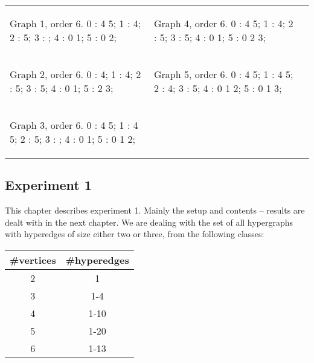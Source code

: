 \begin{tabular}{|p{1.5in} | p{1.5in} | p{1.5in} |}
\begin{minipage}{1.5in}
\begin{output}
Graph 1, order 6.
  0 : 4 5;
  1 : 4;
  2 : 5;
  3 : ;
  4 : 0 1;
  5 : 0 2;

\end{output}
\end{minipage}
&
\begin{minipage}{1.5in}
\begin{output}
Graph 4, order 6.
  0 : 4 5;
  1 : 4;
  2 : 5;
  3 : 5;
  4 : 0 1;
  5 : 0 2 3;

\end{output}
\end{minipage}
\\
\begin{minipage}{1.5in}
\begin{output}
Graph 2, order 6.
  0 : 4;
  1 : 4;
  2 : 5;
  3 : 5;
  4 : 0 1;
  5 : 2 3;

\end{output}
\end{minipage}
&
\begin{minipage}{1.5in}
\begin{output}
Graph 5, order 6.
  0 : 4 5;
  1 : 4 5;
  2 : 4;
  3 : 5;
  4 : 0 1 2;
  5 : 0 1 3;

\end{output}
\end{minipage}
\\
\begin{minipage}{1.5in}
\begin{output}
Graph 3, order 6.
  0 : 4 5;
  1 : 4 5;
  2 : 5;
  3 : ;
  4 : 0 1;
  5 : 0 1 2;
\end{output}
\end{minipage}
&
\\
\end{tabular}


\subsection{Experiment 1}
\label{sec:experiment1}

This chapter describes experiment 1. Mainly the setup and contents -- results are dealt with in the next chapter.
We are dealing with the set of all hypergraphs with hyperedges of size either two or three, from the following classes:

\begin{tabular}{ c | c }
\#vertices & \#hyperedges \\ \hline
2&1 \\ \hline
3&1-4 \\ \hline
4&1-10 \\ \hline
5&1-20 \\ \hline
6&1-13 \\ \hline
\end{tabular}

